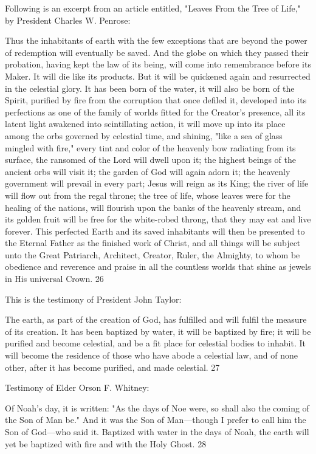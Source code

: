 Following is an excerpt from an article entitled, "Leaves From the Tree of Life," by President
Charles W. Penrose:

Thus the inhabitants of earth with the few exceptions that are beyond the power of
redemption will eventually be saved. And the globe on which they passed their probation,
having kept the law of its being, will come into remembrance before its Maker. It will die
like its products. But it will be quickened again and resurrected in the celestial glory. It has
been born of the water, it will also be born of the Spirit, purified by fire from the corruption
that once defiled it, developed into its perfections as one of the family of worlds fitted for the
Creator's presence, all its latent light awakened into scintillating action, it will move up into
its place among the orbs governed by celestial time, and shining, "like a sea of glass mingled
with fire," every tint and color of the heavenly bow radiating from its surface, the ransomed
of the Lord will dwell upon it; the highest beings of the ancient orbs will visit it; the garden
of God will again adorn it; the heavenly government will prevail in every part; Jesus will
reign as its King; the river of life will flow out from the regal throne; the tree of life, whose
leaves were for the healing of the nations, will flourish upon the banks of the heavenly
stream, and its golden fruit will be free for the white-robed throng, that they may eat and live
forever. This perfected Earth and its saved inhabitants will then be presented to the Eternal
Father as the finished work of Christ, and all things will be subject unto the Great Patriarch,
Architect, Creator, Ruler, the Almighty, to whom be obedience and reverence and praise in
all the countless worlds that shine as jewels in His universal Crown. 26

This is the testimony of President John Taylor:

The earth, as part of the creation of God, has fulfilled and will fulfil the measure of its
creation. It has been baptized by water, it will be baptized by fire; it will be purified and
become celestial, and be a fit place for celestial bodies to inhabit. It will become the
residence of those who have abode a celestial law, and of none other, after it has become
purified, and made celestial. 27

Testimony of Elder Orson F. Whitney:

Of Noah's day, it is written: "As the days of Noe were, so shall also the coming of the Son of
Man be." And it was the Son of Man—though I prefer to call him the Son of God—who said
it. Baptized with water in the days of Noah, the earth will yet be baptized with fire and with
the Holy Ghost. 28

